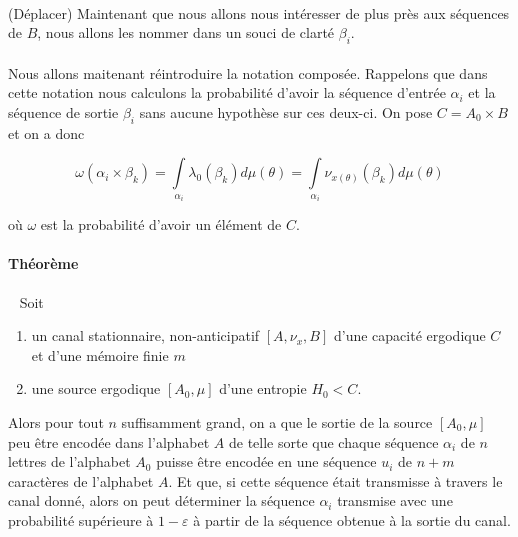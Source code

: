 	\paragraph{}
	(Déplacer) Maintenant que nous allons nous intéresser de plus près aux séquences de $B$, nous allons les nommer dans un souci
	de clarté $\beta_i$.
	
	\paragraph{}
	Nous allons maitenant réintroduire la notation composée. Rappelons que dans cette notation nous calculons la probabilité d'avoir la séquence
	d'entrée $\alpha_i$ et la séquence de sortie $\beta_i$ sans aucune hypothèse sur ces deux-ci. On pose $C = A_0 \times B$ et on a donc
	
	
	\[\omega(\alpha_i\times\beta_k)=\int\limits_{\alpha_i}\lambda_0(\beta_k)d\mu(\theta)=\int\limits_{\alpha_i}\nu_{x(\theta)}(\beta_k)d\mu(\theta)\]
	
	où $\omega$ est la probabilité d'avoir un élément de $C$.
	
	\paragraph{}
	
	\paragraph{Théorème}\ 
	\newline
	Soit 
	\begin{enumerate}
		\item un canal stationnaire, non-anticipatif $[A,\nu_x,B]$ d'une capacité ergodique $C$ et d'une mémoire finie $m$
		\item une source ergodique $[A_0,\mu]$ d'une entropie $H_0<C$.
	\end{enumerate}
	Alors pour tout $n$ suffisamment grand, on a que le sortie de la source $[A_0,\mu]$ peu être encodée dans l'alphabet $A$ de telle sorte que
	chaque séquence $\alpha_i$ de $n$ lettres de l'alphabet $A_0$ puisse être encodée en une séquence $u_i$ de $n+m$ caractères de l'alphabet $A$. 
	Et que, si cette séquence était transmisse à travers le canal donné, alors on peut déterminer la séquence $\alpha_i$ transmise avec une probabilité 
	supérieure à $1-\varepsilon$ à partir de la séquence obtenue à la sortie du canal.



